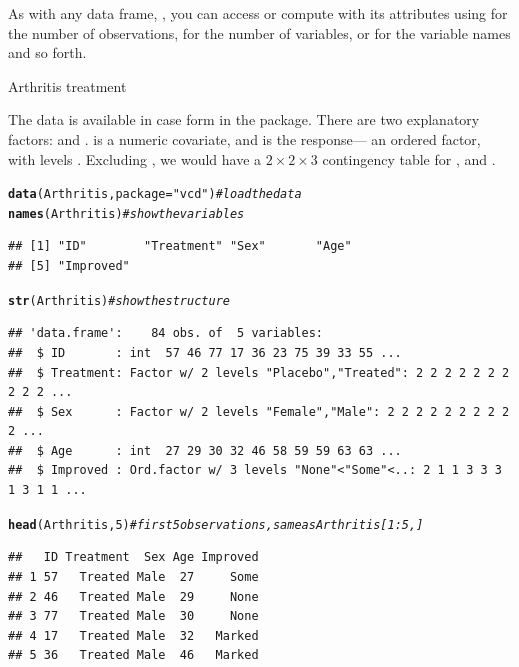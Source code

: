 \documentclass[11pt]{book}\usepackage[]{graphicx}\usepackage[]{color}
\makeatletter
\newcommand{\hlnum}[1]{\textcolor[rgb]{0.686,0.059,0.569}{#1}}%
\newcommand{\hlstr}[1]{\textcolor[rgb]{0.192,0.494,0.8}{#1}}%
\newcommand{\hlcom}[1]{\textcolor[rgb]{0.678,0.584,0.686}{\textit{#1}}}%
\newcommand{\hlstd}[1]{\textcolor[rgb]{0.345,0.345,0.345}{#1}}%
\newcommand{\hlkwc}[1]{\textcolor[rgb]{0.333,0.667,0.333}{#1}}%
\newcommand{\hlkwd}[1]{\textcolor[rgb]{0.737,0.353,0.396}{\textbf{#1}}}%
\newenvironment{kframe}{%
 \def\at@end@of@kframe{}%
 \ifinner\ifhmode%
  \def\at@end@of@kframe{\end{minipage}}%
  \begin{minipage}{\columnwidth}%
 \fi\fi%
 \def\FrameCommand##1{\hskip\@totalleftmargin \hskip-\fboxsep
 \colorbox{shadecolor}{##1}\hskip-\fboxsep
     \hskip-\linewidth \hskip-\@totalleftmargin \hskip\columnwidth}%
 \MakeFramed {\advance\hsize-\width
   \@totalleftmargin\z@ \linewidth\hsize
   \@setminipage}}%
 {\par\unskip\endMakeFramed%
 \at@end@of@kframe}
\newenvironment{knitrout}{}{} %
\renewenvironment{knitrout}{\small\renewcommand{\baselinestretch}{.85}}{} %
\makeatother
\begin{document}
As with any data frame, , you can access or compute with its attributes using  for the number of observations,
 for the number of variables, 
 or  for the variable names and
so forth.

\begin{Example}[ch2-arth]{Arthritis treatment}


The  data is available in case form in the  package. 
There are two explanatory factors:  and . 
is a numeric covariate, and  is the response--- an ordered factor,
with levels 
.
Excluding , we would have
a $2 \times 2 \times 3$ contingency table for ,  and .
\begin{knitrout}\footnotesize
{}\color{fgcolor}\begin{kframe}
\begin{alltt}
\hlkwd{data}\hlstd{(Arthritis,} \hlkwc{package}\hlstd{=}\hlstr{"vcd"}\hlstd{)}  \hlcom{# load the data}
\hlkwd{names}\hlstd{(Arthritis)}      \hlcom{# show the variables}
\end{alltt}
\begin{verbatim}
## [1] "ID"        "Treatment" "Sex"       "Age"      
## [5] "Improved"
\end{verbatim}
\begin{alltt}
\hlkwd{str}\hlstd{(Arthritis)}        \hlcom{# show the structure}
\end{alltt}
\begin{verbatim}
## 'data.frame':	84 obs. of  5 variables:
##  $ ID       : int  57 46 77 17 36 23 75 39 33 55 ...
##  $ Treatment: Factor w/ 2 levels "Placebo","Treated": 2 2 2 2 2 2 2 2 2 2 ...
##  $ Sex      : Factor w/ 2 levels "Female","Male": 2 2 2 2 2 2 2 2 2 2 ...
##  $ Age      : int  27 29 30 32 46 58 59 59 63 63 ...
##  $ Improved : Ord.factor w/ 3 levels "None"<"Some"<..: 2 1 1 3 3 3 1 3 1 1 ...
\end{verbatim}
\begin{alltt}
\hlkwd{head}\hlstd{(Arthritis,}\hlnum{5}\hlstd{)}     \hlcom{# first 5 observations, same as Arthritis[1:5,] }
\end{alltt}
\begin{verbatim}
##   ID Treatment  Sex Age Improved
## 1 57   Treated Male  27     Some
## 2 46   Treated Male  29     None
## 3 77   Treated Male  30     None
## 4 17   Treated Male  32   Marked
## 5 36   Treated Male  46   Marked
\end{verbatim}
\end{kframe}
\end{knitrout}

\end{Example}
\end{document}
